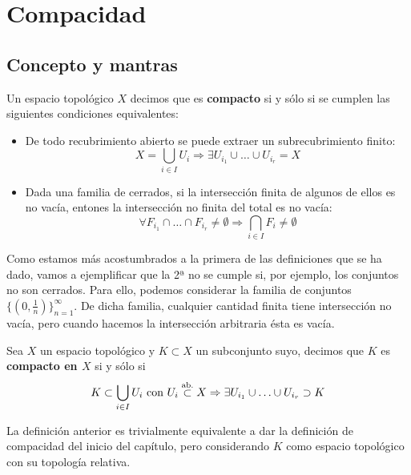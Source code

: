 \chapter{Compacidad}%
\label{cha:compacidad}
\section{Concepto y mantras}%
\label{sec:concepto_y_mantras_comp}
\begin{defi}[Compacidad]
Un espacio topológico $X$ decimos que es \textbf{compacto} si y sólo si se cumplen las siguientes condiciones equivalentes:
\begin{itemize}
\item De todo recubrimiento abierto se puede extraer un subrecubrimiento finito:
\[
X = \bigcup_{i \in  I} U_i \Rightarrow \exists U_{i_1} \cup \ldots \cup U_{i_r} = X
\]
\item Dada una familia de cerrados, si la intersección finita de algunos de ellos es no vacía, entones la intersección no finita del total es no vacía:
\[
\forall F_{i_1} \cap \ldots \cap F_{i_r} \neq \emptyset \Rightarrow \bigcap_{i \in  I} F_i \neq \emptyset
\]
\end{itemize}
\end{defi}

\begin{ej}
Como estamos más acostumbrados a la primera de las definiciones que se ha dado, vamos a ejemplificar que la 2ª no se cumple si, por ejemplo, los conjuntos no son cerrados. Para ello, podemos considerar la familia de conjuntos $\{\left( 0, \frac{1}{n} \right)\}_{n = 1}^\infty$. De dicha familia, cualquier cantidad finita tiene intersección no vacía, pero cuando hacemos la intersección arbitraria ésta es vacía.
\end{ej}

\begin{defi}
Sea $X$ un espacio topológico y $K \subset X$ un subconjunto suyo, decimos que $K$ es \textbf{compacto en $X$} si y sólo si
\[
K \subset \bigcup_{i \in  I} U_i \text{ con } U_i \stackrel{\text{ab.}}{\subset} X \Rightarrow \exists U_{i_1} \cup \ldots \cup U_{i_r} \supset K
\]
\end{defi}

\begin{obs}
La definición anterior es trivialmente equivalente a dar la definición de compacidad del inicio del capítulo, pero considerando $K$ como espacio topológico con su topología relativa.
\end{obs}


